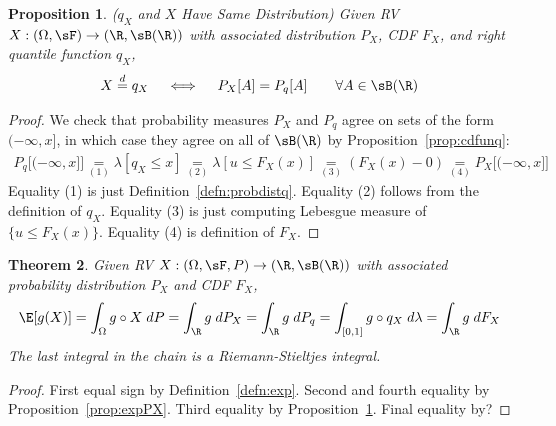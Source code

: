 \documentclass[12pt]{article}
\theoremstyle{plain}
\newtheorem{thm}{Theorem}[section]
\newtheorem{prop}[thm]{Proposition}
\theoremstyle{definition}
\theoremstyle{remark}
\newcommand{\ra}{\rightarrow}
\begin{document}
\begin{prop}\emph{($q_X$ and $X$ Have Same Distribution)}
\label{prop:equaldistqX}
Given RV $X:(\Omega,\sF)\ra(\R,\sB(\R))$ with associated
distribution $P_X$, CDF $F_X$, and right quantile function $q_X$,
\begin{align*}
  X \overset{d}{=} q_X
  \quad\iff\quad
  P_X[A] = P_q[A]
  \qquad \forall A\in\sB(\R)
\end{align*}
\end{prop}
\begin{proof}
We check that probability measures $P_X$ and $P_q$ agree on sets of the
form $(-\infty,x]$, in which case they agree on all of $\sB(\R)$ by
Proposition~\ref{prop:cdfunq}:
\begin{align*}
  P_q\big[(-\infty,x]\big]
  \underset{(1)}{=} \lambda[q_X \leq x]
  \underset{(2)}{=} \lambda[u\leq F_X(x)]
  \underset{(3)}{=} (F_X(x)- 0)
  \underset{(4)}{=} P_X\big[(-\infty,x]\big]
\end{align*}
Equality (1) is just Definition~\ref{defn:probdistq}.
Equality (2) follows from the definition of $q_X$.
Equality (3) is just computing Lebesgue measure of
$\{u\leq F_X(x)\}$.
Equality (4) is definition of $F_X$.
\end{proof}

\begin{thm}
\label{thm:expgX}
Given RV $X:(\Omega,\sF,P)\ra(\R,\sB(\R))$ with associated probability
distribution $P_X$ and CDF $F_X$,
\begin{align*}
  \E[g(X)]
  = \int_\Omega g\circ X \; dP
  = \int_\R g \; dP_X
  = \int_\R g \; dP_q
  = \int_{[0,1]} g \circ q_X \; d\lambda
  = \int_\R g  \; dF_X
\end{align*}
The last integral in the chain is a Riemann-Stieltjes integral.
\end{thm}
\begin{proof}
First equal sign by Definition~\ref{defn:exp}.
Second and fourth equality by Proposition~\ref{prop:expPX}.
Third equality by Proposition~\ref{prop:equaldistqX}.
Final equality by?
\end{proof}

\end{document}
